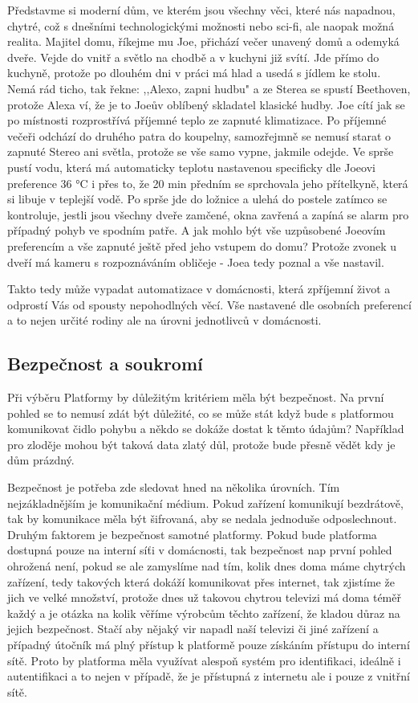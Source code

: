 \documentclass[thesis=B,czech]{FITthesis}[2019/12/23]
\begin{document}
Představme si moderní dům, ve kterém jsou všechny věci, které nás napadnou, chytré, což s dnešními technologickými možnosti nebo sci-fi, ale naopak možná realita. Majitel domu, říkejme mu Joe, přichází večer unavený domů a odemyká dveře. Vejde do vnitř a světlo na chodbě a v kuchyni již svítí. Jde přímo do kuchyně, protože po dlouhém dni v práci má hlad a usedá s jídlem ke stolu. Nemá rád ticho, tak řekne: ,,Alexo, zapni hudbu" a ze Sterea se spustí Beethoven, protože Alexa ví, že je to Joeův oblíbený skladatel klasické hudby. Joe cítí jak se po místnosti rozprostřívá příjemné teplo ze zapnuté klimatizace. Po příjemné večeři odchází do druhého patra do koupelny, samozřejmně se nemusí starat o zapnuté Stereo ani světla, protože se vše samo vypne, jakmile odejde. Ve sprše pustí vodu, která má automaticky teplotu nastavenou specificky dle Joeovi preference 36 °C i přes to, že 20 min předním se sprchovala jeho přítelkyně, která si libuje v teplejší vodě. Po sprše jde do ložnice a ulehá do postele zatímco se kontroluje, jestli jsou všechny dveře zamčené, okna zavřená a zapíná se alarm pro případný pohyb ve spodním patře. A jak mohlo být vše uzpůsobené Joeovím preferencím a vše zapnuté ještě před jeho vstupem do domu? Protože zvonek u dveří má kameru s rozpoznáváním obličeje - Joea tedy poznal a vše nastavil.

Takto tedy může vypadat automatizace v domácnosti, která zpříjemní život a odprostí Vás od spousty nepohodlných věcí. Vše nastavené dle osobních preferencí a to nejen určité rodiny ale na úrovni jednotlivců v domácnosti.


\subsection{Bezpečnost a soukromí}  %
Při výběru Platformy by důležitým kritériem měla být bezpečnost. Na první pohled se to nemusí zdát být důležité, co se může stát když bude s platformou komunikovat čidlo pohybu a někdo se dokáže dostat k těmto údajům? Například pro zloděje mohou být taková data zlatý důl, protože bude přesně vědět kdy je dům prázdný.

Bezpečnost je potřeba zde sledovat hned na několika úrovních. Tím nejzákladnějším je komunikační médium. Pokud zařízení komunikují bezdrátově, tak by komunikace měla být šifrovaná, aby se nedala jednoduše odposlechnout. Druhým faktorem je bezpečnost samotné platformy. Pokud bude platforma dostupná pouze na interní síťi v domácnosti, tak bezpečnost nap první pohled ohrožená není, pokud se ale zamyslíme nad tím, kolik dnes doma máme chytrých zařízení, tedy takových která dokáží komunikovat přes internet, tak zjistíme že jich ve velké množství, protože dnes už takovou chytrou televizi má doma téměř každý a je otázka na kolik věříme výrobcům těchto zařízení, že kladou důraz na jejich bezpečnost. Stačí aby nějaký vir napadl naší televizi či jiné zařízení a případný útočník má plný přístup k platformě pouze získáním přístupu do interní sítě. Proto by platforma měla využívat alespoň systém pro identifikaci, ideálně i autentifikaci a to nejen v případě, že je přístupná z internetu ale i pouze z vnitřní sítě.
\end{document}
